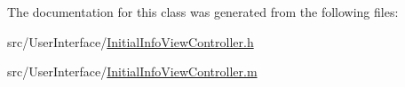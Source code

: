 The documentation for this class was generated from the following files\-:\begin{DoxyCompactItemize}
\item 
src/\-User\-Interface/\hyperlink{_initial_info_view_controller_8h}{Initial\-Info\-View\-Controller.\-h}\item 
src/\-User\-Interface/\hyperlink{_initial_info_view_controller_8m}{Initial\-Info\-View\-Controller.\-m}\end{DoxyCompactItemize}
